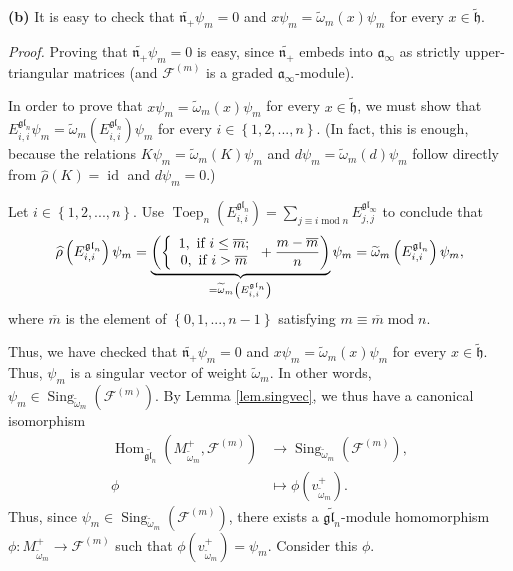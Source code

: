 \documentclass[etingof-lie.tex]{subfiles}
\begin{document}
\textbf{(b)} It is easy to check that $\widetilde{\mathfrak{n}_{+}}\psi_{m}=0$
and $x\psi_{m}=\widetilde{\omega}_{m}\left(  x\right)  \psi_{m}$ for every
$x\in\widetilde{\mathfrak{h}}$.

\textit{Proof.} Proving that $\widetilde{\mathfrak{n}_{+}}\psi_{m}=0$ is easy,
since $\widetilde{\mathfrak{n}_{+}}$ embeds into $\mathfrak{a}_{\infty}$ as
strictly upper-triangular matrices (and $\mathcal{F}^{\left(  m\right)  }$ is
a graded $\mathfrak{a}_{\infty}$-module).

In order to prove that $x\psi_{m}=\widetilde{\omega}_{m}\left(  x\right)
\psi_{m}$ for every $x\in\widetilde{\mathfrak{h}}$, we must show that
$E_{i,i}^{\mathfrak{gl}_{n}}\psi_{m}=\widetilde{\omega}_{m}\left(
E_{i,i}^{\mathfrak{gl}_{n}}\right)  \psi_{m}$ for every $i\in\left\{
1,2,...,n\right\}  $. (In fact, this is enough, because the relations
$K\psi_{m}=\widetilde{\omega}_{m}\left(  K\right)  \psi_{m}$ and $d\psi
_{m}=\widetilde{\omega}_{m}\left(  d\right)  \psi_{m}$ follow directly from
$\widehat{\rho}\left(  K\right)  =\operatorname*{id}$ and $d\psi_{m}=0$.)

Let $i\in\left\{  1,2,...,n\right\}  $. Use $\operatorname*{Toep}%
\nolimits_{n}\left(  E_{i,i}^{\mathfrak{gl}_{n}}\right)  =\sum\limits_{j\equiv
i\operatorname{mod}n}E_{j,j}^{\mathfrak{gl}_{\infty}}$ to conclude that
\[
\widehat{\rho}\left(  E_{i,i}^{\mathfrak{gl}_{n}}\right)  \psi_{m}%
=\underbrace{\left(  \left\{
\begin{array}
[c]{c}%
1,\text{ if }i\leq\overline{m};\\
0,\text{ if }i>\overline{m}%
\end{array}
\right.  +\dfrac{m-\overline{m}}{n}\right)  }_{=\widetilde{\omega}_{m}\left(
E_{i,i}^{\mathfrak{gl}_{n}}\right)  }\psi_{m}=\widetilde{\omega}_{m}\left(
E_{i,i}^{\mathfrak{gl}_{n}}\right)  \psi_{m},
\]
where $\overline{m}$ is the element of $\left\{  0,1,...,n-1\right\}  $
satisfying $m\equiv\overline{m}\operatorname{mod}n$.

Thus, we have checked that $\widetilde{\mathfrak{n}_{+}}\psi_{m}=0$ and
$x\psi_{m}=\widetilde{\omega}_{m}\left(  x\right)  \psi_{m}$ for every
$x\in\widetilde{\mathfrak{h}}$. Thus, $\psi_{m}$ is a singular vector of
weight $\widetilde{\omega}_{m}$. In other words, $\psi_{m}\in
\operatorname*{Sing}\nolimits_{\widetilde{\omega}_{m}}\left(  \mathcal{F}%
^{\left(  m\right)  }\right)  $. By Lemma \ref{lem.singvec}, we thus have a
canonical isomorphism%
\begin{align*}
\operatorname*{Hom}\nolimits_{\widetilde{\mathfrak{gl}_{n}}}\left(
M_{\widetilde{\omega}_{m}}^{+},\mathcal{F}^{\left(  m\right)  }\right)   &
\rightarrow\operatorname*{Sing}\nolimits_{\widetilde{\omega}_{m}}\left(
\mathcal{F}^{\left(  m\right)  }\right)  ,\\
\phi &  \mapsto\phi\left(  v_{\widetilde{\omega}_{m}}^{+}\right)  .
\end{align*}
Thus, since $\psi_{m}\in\operatorname*{Sing}\nolimits_{\widetilde{\omega}_{m}%
}\left(  \mathcal{F}^{\left(  m\right)  }\right)  $, there exists a
$\widetilde{\mathfrak{gl}_{n}}$-module homomorphism $\phi:M_{\widetilde{\omega
}_{m}}^{+}\rightarrow\mathcal{F}^{\left(  m\right)  }$ such that $\phi\left(
v_{\widetilde{\omega}_{m}}^{+}\right)  =\psi_{m}$. Consider this $\phi$.
\end{document}
